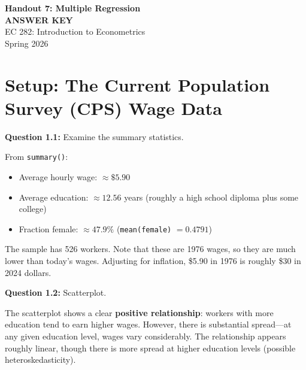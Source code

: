 \documentclass[11pt,letterpaper]{article}
\begin{document}
\begin{center}
{\LARGE\bfseries Handout 7: Multiple Regression}\\[0.3cm]
{\Large\color{red}\bfseries ANSWER KEY}\\[0.5cm]
{\large EC 282: Introduction to Econometrics}\\[0.3cm]
{\large Spring 2026}
\end{center}

\vspace{0.5cm}

\section{Setup: The Current Population Survey (CPS) Wage Data}

\textbf{Question 1.1:} Examine the summary statistics.

\begin{answer}
From \texttt{summary()}:
\begin{itemize}[noitemsep]
\item Average hourly wage: $\approx \$5.90$
\item Average education: $\approx 12.56$ years (roughly a high school diploma plus some college)
\item Fraction female: $\approx 47.9\%$ (\texttt{mean(female)} $= 0.4791$)
\end{itemize}

The sample has 526 workers. Note that these are 1976 wages, so they are much lower than today's wages. Adjusting for inflation, \$5.90 in 1976 is roughly \$30 in 2024 dollars.
\end{answer}

\textbf{Question 1.2:} Scatterplot.

\begin{answer}
The scatterplot shows a clear \textbf{positive relationship}: workers with more education tend to earn higher wages. However, there is substantial spread---at any given education level, wages vary considerably. The relationship appears roughly linear, though there is more spread at higher education levels (possible heteroskedasticity).
\end{answer}

\end{document}
